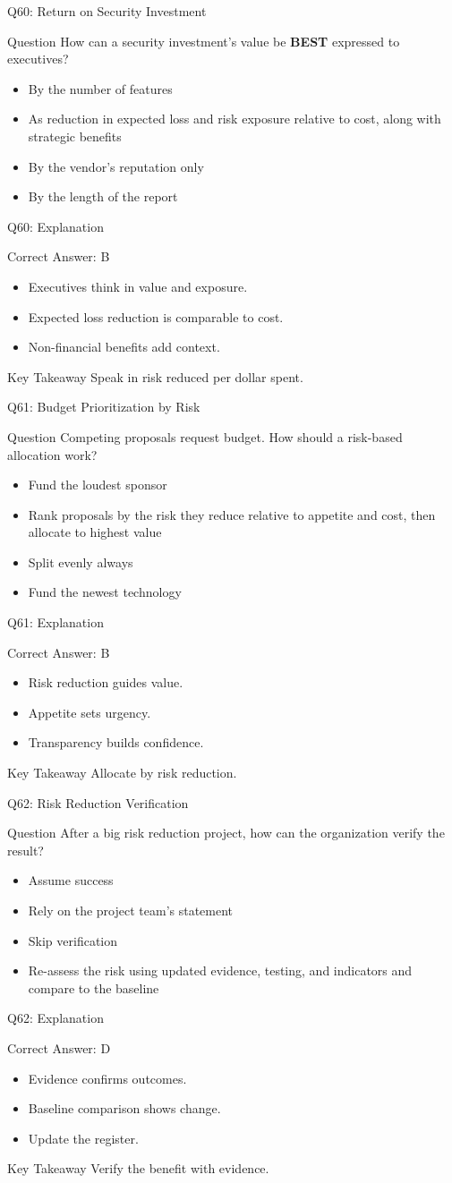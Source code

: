 \documentclass[aspectratio=169]{beamer}
\newcommand{\hq}[7]{%
	\begin{frame}{Q#1: #2}
		\begin{block}{Question}
			#3
		\end{block}
		\begin{itemize}
			#4
		\end{itemize}
	\end{frame}
	\begin{frame}{Q#1: Explanation}
		\begin{block}{Correct Answer: #5}
			\begin{itemize}
				#6
			\end{itemize}
		\end{block}
		\begin{alertblock}{Key Takeaway}
			#7
		\end{alertblock}
	\end{frame}
}
\begin{document}
	\hq{60}{Return on Security Investment}
	{How can a security investment's value be \textbf{BEST} expressed to executives?}
	{\item[\textbf{(A)}] By the number of features
		\item[\textbf{(B)}] As reduction in expected loss and risk exposure relative to cost, along with strategic benefits
		\item[\textbf{(C)}] By the vendor's reputation only
		\item[\textbf{(D)}] By the length of the report}
	{B}
	{\item Executives think in value and exposure.
		\item Expected loss reduction is comparable to cost.
		\item Non-financial benefits add context.}
	{Speak in risk reduced per dollar spent.}

	\hq{61}{Budget Prioritization by Risk}
	{Competing proposals request budget. How should a risk-based allocation work?}
	{\item[\textbf{(A)}] Fund the loudest sponsor
		\item[\textbf{(B)}] Rank proposals by the risk they reduce relative to appetite and cost, then allocate to highest value
		\item[\textbf{(C)}] Split evenly always
		\item[\textbf{(D)}] Fund the newest technology}
	{B}
	{\item Risk reduction guides value.
		\item Appetite sets urgency.
		\item Transparency builds confidence.}
	{Allocate by risk reduction.}

	\hq{62}{Risk Reduction Verification}
	{After a big risk reduction project, how can the organization verify the result?}
	{\item[\textbf{(A)}] Assume success
		\item[\textbf{(B)}] Rely on the project team's statement
		\item[\textbf{(C)}] Skip verification
		\item[\textbf{(D)}] Re-assess the risk using updated evidence, testing, and indicators and compare to the baseline}
	{D}
	{\item Evidence confirms outcomes.
		\item Baseline comparison shows change.
		\item Update the register.}
	{Verify the benefit with evidence.}
\end{document}
